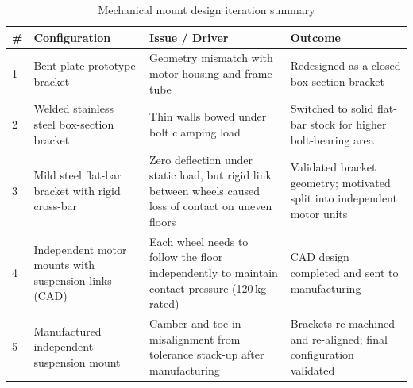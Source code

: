 \documentclass[12pt,a4paper]{report}
\begin{document}
\begin{table}[H]
\centering
\caption{Mechanical mount design iteration summary}
\label{tab:mech_iterations}
\setlength{\tabcolsep}{7pt}          %
\begin{tabularx}{\textwidth}{@{}>{\centering\arraybackslash}p{0.5cm}
                              >{\RaggedRight\arraybackslash}p{4.8cm}
                              L
                              L@{}}
\toprule
{}
\textbf{\#} & \textbf{Configuration}
            & \textbf{Issue / Driver}
            & \textbf{Outcome} \\
\midrule
 
1
& Bent-plate prototype bracket
& Geometry mismatch with motor housing and frame tube
& Redesigned as a closed box-section bracket \\[3pt]
 
2
& Welded stainless steel box-section bracket
& Thin walls bowed under bolt clamping load
& Switched to solid flat-bar stock for higher bolt-bearing area \\[3pt]
 
3
& Mild steel flat-bar bracket with rigid cross-bar
& Zero deflection under static load, but rigid link between wheels caused loss of contact on uneven floors
& Validated bracket geometry; motivated split into independent motor units \\[3pt]
 
4
& Independent motor mounts with suspension links (CAD)
& Each wheel needs to follow the floor independently to maintain contact pressure (120\,kg rated)
& CAD design completed and sent to manufacturing \\[3pt]
 
5
& Manufactured independent suspension mount
& Camber and toe-in misalignment from tolerance stack-up after manufacturing
& Brackets re-machined and re-aligned; final configuration validated \\
 
\bottomrule
\end{tabularx}
\end{table}
\end{document}
